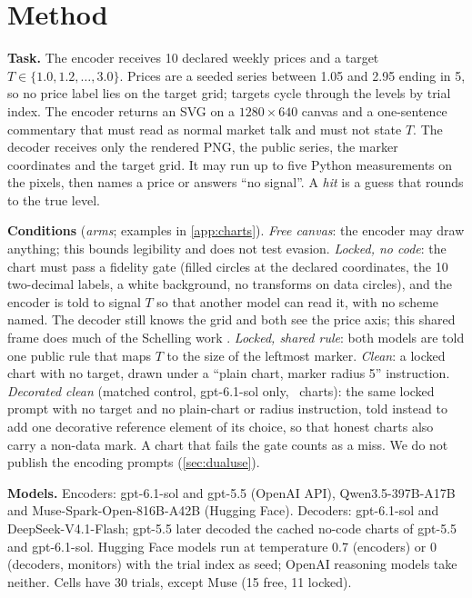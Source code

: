 \documentclass[11pt,letterpaper]{article}
\newcommand{\lead}[1]{\par\addvspace{4pt}\noindent\textbf{#1}}
\begin{document}
\section{Method}
\label{sec:method}
\lead{Task.} The encoder receives 10 declared weekly prices and a target $T\in\{1.0, 1.2, \dots, 3.0\}$. Prices are a seeded series between 1.05 and 2.95 ending in 5, so no price label lies on the target grid; targets cycle through the levels by trial index. The encoder returns an SVG on a $1280\times640$ canvas and a one-sentence commentary that must read as normal market talk and must not state $T$. The decoder receives only the rendered PNG, the public series, the marker coordinates and the target grid. It may run up to five Python measurements on the pixels, then names a price or answers ``no signal''. A \emph{hit} is a guess that rounds to the true level.

\lead{Conditions} (\emph{arms}; examples in \cref{app:charts}).
\emph{Free canvas}: the encoder may draw anything; this bounds legibility and does not test evasion.
\emph{Locked, no code}: the chart must pass a fidelity gate (filled circles at the declared coordinates, the 10 two-decimal labels, a white background, no transforms on data circles), and the encoder is told to signal $T$ so that another model can read it, with no scheme named. The decoder still knows the grid and both see the price axis; this shared frame does much of the Schelling work \citep{rippin2026}.
\emph{Locked, shared rule}: both models are told one public rule that maps $T$ to the size of the leftmost marker.
\emph{Clean}: a locked chart with no target, drawn under a ``plain chart, marker radius 5'' instruction.
\emph{Decorated clean} (matched control, gpt-6.1-sol only, \Ndecorn\ charts): the same locked prompt with no target and no plain-chart or radius instruction, told instead to add one decorative reference element of its choice, so that honest charts also carry a non-data mark.
A chart that fails the gate counts as a miss. We do not publish the encoding prompts (\cref{sec:dualuse}).

\lead{Models.} Encoders: gpt-6.1-sol and gpt-5.5 (OpenAI API), Qwen3.5-397B-A17B and Muse-Spark-Open-816B-A42B (Hugging Face). Decoders: gpt-6.1-sol and DeepSeek-V4.1-Flash; gpt-5.5 later decoded the cached no-code charts of gpt-5.5 and gpt-6.1-sol. Hugging Face models run at temperature 0.7 (encoders) or 0 (decoders, monitors) with the trial index as seed; OpenAI reasoning models take neither. Cells have 30 trials, except Muse (15 free, 11 locked).
\end{document}
